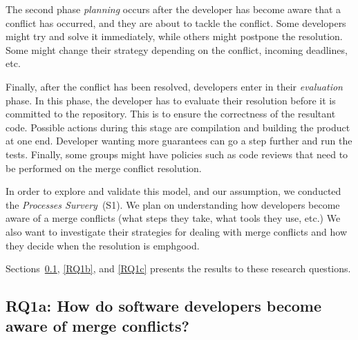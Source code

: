 The second phase \emph{planning} occurs after the developer has become aware that a conflict has occurred, and they are about to tackle the conflict.
Some developers might try and solve it immediately, while others might postpone the resolution.
Some might change their strategy depending on the conflict, incoming deadlines, etc.

Finally, after the conflict has been resolved, developers enter in their \emph{evaluation} phase.
In this phase, the developer has to evaluate their resolution before it is committed to the repository. 
This is to ensure the correctness of the resultant code.
Possible actions during this stage are compilation and building the product at one end.
Developer wanting more guarantees can go a step further and run the tests.
Finally, some groups might have policies such as code reviews that need to be performed on the merge conflict resolution.
 
In order to explore and validate this model, and our assumption, we conducted the \emph{Processes Survery}~(S1).
We plan on understanding how developers become aware of a merge conflicts (what steps they take, what tools they use, etc.)
We also want to investigate their strategies for dealing with merge conflicts and how they decide when the resolution is emph{good.}

Sections~\ref{RQ1a}, \ref{RQ1b}, and \ref{RQ1c} presents the results to these research questions.

\subsection{\textbf{RQ1a:} How do software developers become aware of merge conflicts?}\label{RQ1a}

